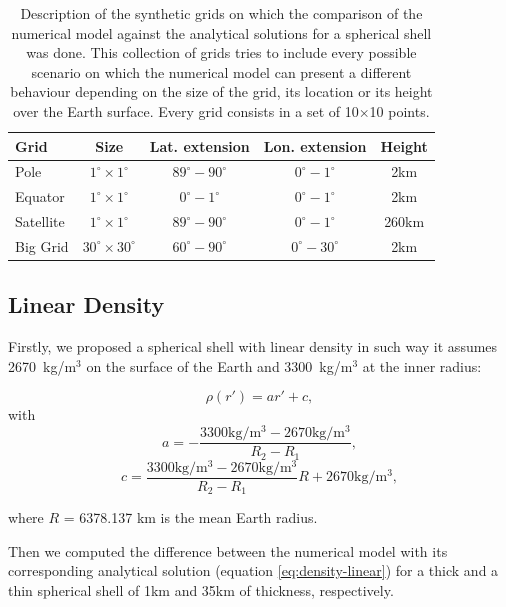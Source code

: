 \documentclass[extra]{gji}
\begin{document}
\begin{table}
\caption{
    Description of the synthetic grids on which the comparison of the numerical model against the analytical solutions for a spherical shell was done. This collection of grids tries to include every possible scenario on which the numerical model can present a different behaviour depending on the size of the grid, its location or its height over the Earth surface. Every grid consists in a set of 10$\times$10 points.
}
\label{tab:grids}
\begin{tabular}{lcccc}
    Grid & Size & Lat. extension & Lon. extension & Height \\ \hline
    Pole & $1^\circ \times 1^\circ$ & $89^\circ - 90^\circ$ & $0^\circ - 1^\circ$ & 2km \\
    Equator & $1^\circ \times 1^\circ$ & $0^\circ - 1^\circ$ & $0^\circ - 1^\circ$ & 2km \\
    Satellite & $1^\circ \times 1^\circ$ & $89^\circ - 90^\circ$ & $0^\circ - 1^\circ$ & 260km \\
    Big Grid & $30^\circ \times 30^\circ$ & $60^\circ - 90^\circ$ & $0^\circ - 30^\circ$ & 2km \\
\end{tabular}
\end{table}


\subsection{Linear Density}
Firstly,  we proposed a spherical shell with linear density in such way it assumes 2670~kg/m$^3$ on the surface of the Earth and 3300~kg/m$^3$ at the inner radius:

\begin{equation}
    \rho(r') = ar' + c,
    \label{eq:density-linear}
\end{equation}
\noindent with 
\begin{equation}
    a = -\frac{3300\text{kg/m$^3$} - 2670\text{kg/m$^3$}}{R_2 - R_1},
\end{equation}
\begin{equation}
    c = \frac{3300\text{kg/m$^3$} - 
        2670\text{kg/m$^3$}}{R_2 - R_1} R + 
        2670\text{kg/m$^3$},
\end{equation}

\noindent where $R$ = 6378.137 km is the mean Earth radius.

Then we computed the difference between the numerical model with its corresponding analytical solution (equation \ref{eq:density-linear}) for a thick and a thin spherical shell of 1km and 35km of thickness, respectively.
\end{document}
